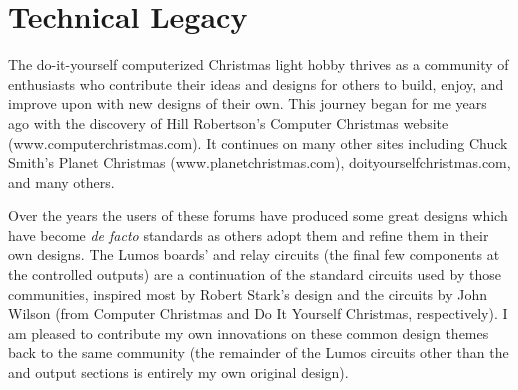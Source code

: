 \section*{Technical Legacy}\label{sec:legacy}
The do-it-yourself computerized Christmas light hobby thrives as a community of enthusiasts
who contribute their ideas and designs for others to build, enjoy, and improve upon with new
designs of their own.  
This journey began for me years ago with the discovery of Hill Robertson's Computer Christmas
website ({\ttfamily www.computerchristmas.com}).  It continues on many other sites including 
Chuck Smith's Planet Christmas ({\ttfamily www.planetchrist\-mas\-.com}), 
{\ttfamily doityourselfchristmas.com}, and many others.  

Over the years the users of these forums have produced some great designs which have become
\emph{de facto} standards as others adopt them and refine them in their own designs.  The Lumos
boards'  and  relay circuits (the final few components at the controlled
outputs) are a continuation of the standard circuits used by those communities, inspired most
by Robert Stark's  design and the   circuits by John Wilson (from Computer
Christmas and Do It Yourself Christmas, respectively).  I am pleased to contribute my own
innovations on these common design themes back to the same community (the remainder of the
Lumos circuits other than the  and  output sections is entirely
my own original design).

